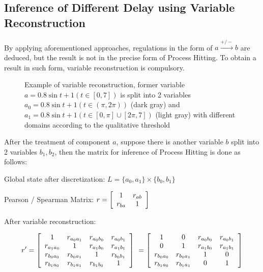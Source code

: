 \subsection{Inference of Different Delay using Variable Reconstruction}
By applying aforementioned approaches, regulations in the form of $a\xrightarrow{+/-}b$ are deduced, but the result is not in the precise form of Process Hitting. To obtain a result in such form, variable reconstruction is compulsory. \par
\begin{figure}[!ht]
\centering
{}
\caption{Example of variable reconstruction, former variable $a=0.8\sin t+1(t\in [0,7])$ is split into 2 variables $a_0=0.8\sin t+1(t\in (\pi,2\pi))$ (dark gray) and $a_1=0.8\sin t+1(t\in [0,\pi]\cup[2\pi,7])$ (light gray) with different domains according to the qualitative threshold}\label{varRec}
\end{figure}
After the treatment of component $a$, suppose there is another variable $b$ split into 2 variables $b_1,b_2$, then the matrix for inference of Process Hitting is done as follows:\par
Global state after discretization: $L=\{a_0,a_1\}\times \{b_0,b_1\}\ $\par
Pearson / Spearman Matrix: $r=\left[
\begin{array}{*{20}c}
1 & r_{ab}\\
r_{ba} & 1 \\
\end{array}
\right]\ 
$\par
After variable reconstruction:\par
$$r'=\left[
\begin{array}{*{20}c}
1 & r_{a_0a_1}& r_{a_0b_0}&r_{a_0b_1}\\
r_{a_1a_0} & 1& r_{a_1b_0}&r_{a_1b_1}\\
r_{b_0a_0} & r_{b_0a_1}& 1&r_{b_0b_1}\\
r_{b_1a_0} & r_{b_1a_1}& r_{b_1b_0}&1\\
\end{array}
\right]\ =\left[\begin{array}{*{20}c}
1 & 0& r_{a_0b_0}&r_{a_0b_1}\\
0 & 1& r_{a_1b_0}&r_{a_1b_1}\\
r_{b_0a_0} & r_{b_0a_1}& 1&0\\
r_{b_1a_0} & r_{b_1a_1}& 0&1\\
\end{array}\right]$$

